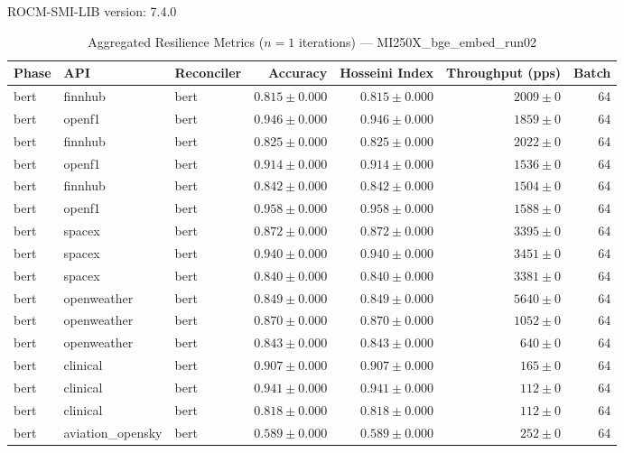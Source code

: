 ROCM-SMI-LIB version: 7.4.0

\begin{table}[htbp]
\caption{Aggregated Resilience Metrics ($n=1$ iterations) --- MI250X_bge_embed_run02}
\begin{tabular}{l l l r r r r}
\hline
Phase & API & Reconciler & Accuracy & Hosseini Index & Throughput (pps) & Batch \\
\hline
bert & finnhub & bert & $0.815\pm0.000$ & $0.815\pm0.000$ & $2009\pm0$ & 64 \\
bert & openf1 & bert & $0.946\pm0.000$ & $0.946\pm0.000$ & $1859\pm0$ & 64 \\
bert & finnhub & bert & $0.825\pm0.000$ & $0.825\pm0.000$ & $2022\pm0$ & 64 \\
bert & openf1 & bert & $0.914\pm0.000$ & $0.914\pm0.000$ & $1536\pm0$ & 64 \\
bert & finnhub & bert & $0.842\pm0.000$ & $0.842\pm0.000$ & $1504\pm0$ & 64 \\
bert & openf1 & bert & $0.958\pm0.000$ & $0.958\pm0.000$ & $1588\pm0$ & 64 \\
bert & spacex & bert & $0.872\pm0.000$ & $0.872\pm0.000$ & $3395\pm0$ & 64 \\
bert & spacex & bert & $0.940\pm0.000$ & $0.940\pm0.000$ & $3451\pm0$ & 64 \\
bert & spacex & bert & $0.840\pm0.000$ & $0.840\pm0.000$ & $3381\pm0$ & 64 \\
bert & openweather & bert & $0.849\pm0.000$ & $0.849\pm0.000$ & $5640\pm0$ & 64 \\
bert & openweather & bert & $0.870\pm0.000$ & $0.870\pm0.000$ & $1052\pm0$ & 64 \\
bert & openweather & bert & $0.843\pm0.000$ & $0.843\pm0.000$ & $640\pm0$ & 64 \\
bert & clinical & bert & $0.907\pm0.000$ & $0.907\pm0.000$ & $165\pm0$ & 64 \\
bert & clinical & bert & $0.941\pm0.000$ & $0.941\pm0.000$ & $112\pm0$ & 64 \\
bert & clinical & bert & $0.818\pm0.000$ & $0.818\pm0.000$ & $112\pm0$ & 64 \\
bert & aviation\_opensky & bert & $0.589\pm0.000$ & $0.589\pm0.000$ & $252\pm0$ & 64 \\

\end{tabular}
\end{table}
